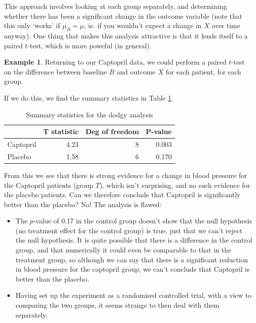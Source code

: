 \documentclass[
  openany]{book}
\providecommand{\tightlist}{%
  \setlength{\itemsep}{0pt}\setlength{\parskip}{0pt}}
\theoremstyle{definition}
\theoremstyle{definition}
\newtheorem{example}{Example}[chapter]
\theoremstyle{definition}
\theoremstyle{definition}
\theoremstyle{remark}
\begin{document}
This approach involves looking at each group separately, and determining whether there has been a significant change in the outcome variable (note that this only `works' if \(\mu_B = \mu\), ie. if you wouldn't expect a change in \(X\) over time anyway). One thing that makes this analysis attractive is that it lends itself to a paired \(t\)-test, which is more poweful (in general).

\begin{example}

Returning to our Captopril data, we could perform a paired \(t\)-test on the difference between baseline \(B\) and outcome \(X\) for each patient, for each group.

If we do this, we find the summary statistics in Table \ref{tab:ttestdodge}.

\begin{table}

\caption{\label{tab:ttestdodge}Summary statistics for the dodgy analysis}
\centering
\begin{tabular}[t]{l|r|r|r}
\hline
  & T statistic & Deg of freedom & P-value\\
\hline
Captopril & 4.23 & 8 & 0.003\\
\hline
Placebo & 1.58 & 6 & 0.170\\
\hline
\end{tabular}
\end{table}

From this we see that there is strong evidence for a change in blood pressure for the Captopril patients (group \(T\)), which isn't surprising, and no such evidence for the placebo patients. Can we therefore conclude that Captopril is significantly better than the placebo? No! The analysis is flawed:

\begin{itemize}
\tightlist
\item
  The \(p\)-value of 0.17 in the control group doesn't show that the null hypothesis (no treatment effect for the control group) is true, just that we can't reject the null hypothesis. It is quite possible that there is a difference in the control group, and that numerically it could even be comparable to that in the treatment group, so although we can say that there is a significant reduction in blood pressure for the captopril group, we can't conclude that Captopril is better than the placebo.
\item
  Having set up the experiment as a randomised controlled trial, with a view to comparing the two groups, it seems strange to then deal with them separately.
\end{itemize}

\end{example}
\end{document}

